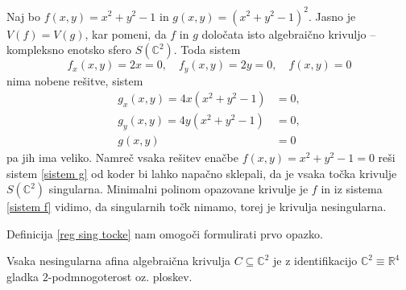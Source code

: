 \documentclass[mat1]{fmfdelo}
\newcommand{\R}{\mathbb R}
\newcommand{\C}{\mathbb C}
\theoremstyle{definition}
\begin{document}
\begin{primer*}
    Naj bo $f(x,y) = x^2 + y^2 - 1$ in $g(x,y) = (x^2 + y^2 - 1)^2$. Jasno je $V(f) = V(g)$, kar pomeni, da $f$ in $g$ določata isto algebraično krivuljo -- kompleksno enotsko sfero $S(\C^2)$. Toda sistem 
    \begin{equation}
        \label{sistem f}
        f_x(x,y) = 2x = 0, \quad f_y(x,y) = 2y = 0, \quad f(x,y) = 0
    \end{equation}
    nima nobene rešitve, sistem
    \begin{align}
        \label{sistem g}
        g_x(x,y) = 4x(x^2 + y^2 - 1) &= 0, \nonumber \\ 
        g_y(x,y) = 4y(x^2 + y^2 - 1) &= 0, \\
        g(x,y) &= 0 \nonumber
    \end{align}
    pa jih ima veliko. Namreč vsaka rešitev enačbe $f(x,y) = x^2 + y^2 - 1 = 0$ reši sistem \ref{sistem g} od koder bi lahko napačno sklepali, da je vsaka točka krivulje $S(\C^2)$ singularna. Minimalni polinom opazovane krivulje je $f$ in iz sistema \ref{sistem f} vidimo, da singularnih točk nimamo, torej je krivulja nesingularna. 
    
\end{primer*}

Definicija \ref{reg sing tocke} nam omogoči formulirati prvo opazko.

\begin{trditev}
    Vsaka nesingularna afina algebraična krivulja $C \subseteq \C^2$ je z identifikacijo $\C^2 \equiv \R^4$ gladka $2$-podmnogoterost oz. ploskev.
\end{trditev}
\end{document}
